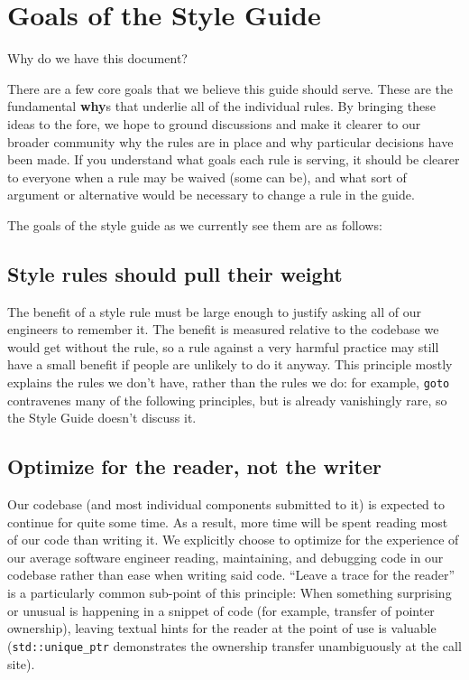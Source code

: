 
\section{Goals of the Style Guide}\label{sec:goals-of-the-style-guide}
Why do we have this document?

There are a few core goals that we believe this guide should serve. These are the fundamental \textbf{why}s that underlie all of the individual rules. By bringing these ideas to the fore, we hope to ground discussions and make it clearer to our broader community why the rules are in place and why particular decisions have been made. If you understand what goals each rule is serving, it should be clearer to everyone when a rule may be waived (some can be), and what sort of argument or alternative would be necessary to change a rule in the guide.

The goals of the style guide as we currently see them are as follows:

\subsection{Style rules should pull their weight}
The benefit of a style rule must be large enough to justify asking all of our engineers to remember it. The benefit is measured relative to the codebase we would get without the rule, so a rule against a very harmful practice may still have a small benefit if people are unlikely to do it anyway. This principle mostly explains the rules we don’t have, rather than the rules we do: for example, \texttt{goto} contravenes many of the following principles, but is already vanishingly rare, so the Style Guide doesn’t discuss it.
\subsection{Optimize for the reader, not the writer}
Our codebase (and most individual components submitted to it) is expected to continue for quite some time. As a result, more time will be spent reading most of our code than writing it. We explicitly choose to optimize for the experience of our average software engineer reading, maintaining, and debugging code in our codebase rather than ease when writing said code. \enquote{Leave a trace for the reader} is a particularly common sub-point of this principle: When something surprising or unusual is happening in a snippet of code (for example, transfer of pointer ownership), leaving textual hints for the reader at the point of use is valuable (\texttt{std::unique_ptr} demonstrates the ownership transfer unambiguously at the call site).
